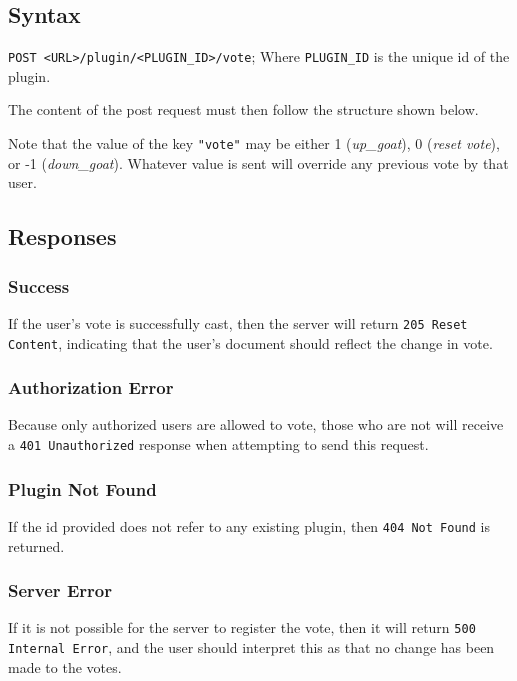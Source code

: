 \documentclass[a4paper, 12pt]{article}
\begin{document}
		\subsection{Syntax}
			\verb|POST <URL>/plugin/<PLUGIN_ID>/vote|; \footnotesize{Where \verb|PLUGIN_ID| is the unique id of the plugin.}

			The content of the post request must then follow the structure shown below.

			

			Note that the value of the key \verb|"vote"| may be either 1 (\emph{up\_goat}), 0 (\emph{reset vote}), or -1 (\emph{down\_goat}). Whatever value is sent will override any previous vote by that user.

		\subsection{Responses}
			\subsubsection{Success}
				If the user's vote is successfully cast, then the server will return \verb|205 Reset Content|, indicating that the user's document should reflect the change in vote.

			\subsubsection{Authorization Error}
				Because only authorized users are allowed to vote, those who are not will receive a \verb|401 Unauthorized| response when attempting to send this request.

			\subsubsection{Plugin Not Found}
				If the id provided does not refer to any existing plugin, then \verb|404 Not Found| is returned.

			\subsubsection{Server Error}
				If it is not possible for the server to register the vote, then it will return \verb|500 Internal Error|, and the user should interpret this as that no change has been made to the votes.
\end{document}

